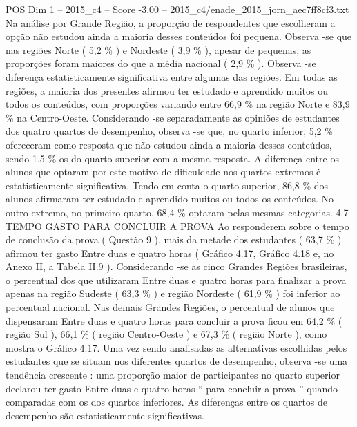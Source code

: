 \begin{textsample}{POS Dim 1 – 2015\_c4 – Score -3.00 – 2015\_c4/enade\_2015\_jorn\_aec7ff8cf3.txt}
Na análise por Grande Região, a proporção de respondentes que escolheram a opção não estudou ainda a maioria desses conteúdos foi pequena.
Observa -se que nas regiões Norte ( 5,2 \% ) e Nordeste ( 3,9 \% ), apesar de pequenas, as proporções foram maiores do que a média nacional ( 2,9 \% ).
Observa -se diferença estatisticamente significativa entre algumas das regiões.
Em todas as regiões, a maioria dos presentes afirmou ter estudado e aprendido muitos ou todos os conteúdos, com proporções variando entre 66,9 \% na região Norte e 83,9 \% na Centro-Oeste.
Considerando -se separadamente as opiniões de estudantes dos quatro quartos de desempenho, observa -se que, no quarto inferior, 5,2 \% ofereceram como resposta que não estudou ainda a maioria desses conteúdos, sendo 1,5 \% os do quarto superior com a mesma resposta.
A diferença entre os alunos que optaram por este motivo de dificuldade nos quartos extremos é estatisticamente significativa.
Tendo em conta o quarto superior, 86,8 \% dos alunos afirmaram ter estudado e aprendido muitos ou todos os conteúdos.
No outro extremo, no primeiro quarto, 68,4 \% optaram pelas mesmas categorias. 4.7 TEMPO GASTO PARA CONCLUIR A PROVA Ao responderem sobre o tempo de conclusão da prova ( Questão 9 ), mais da metade dos estudantes ( 63,7 \% ) afirmou ter gasto Entre duas e quatro horas ( Gráfico 4.17, Gráfico 4.18 e, no Anexo II, a Tabela II.9 ).
Considerando -se as cinco Grandes Regiões brasileiras, o percentual dos que utilizaram Entre duas e quatro horas para finalizar a prova apenas na região Sudeste ( 63,3 \% ) e região Nordeste ( 61,9 \% ) foi inferior ao percentual nacional.
Nas demais Grandes Regiões, o percentual de alunos que dispensaram Entre duas e quatro horas para concluir a prova ficou em 64,2 \% ( região Sul ), 66,1 \% ( região Centro-Oeste ) e 67,3 \% ( região Norte ), como mostra o Gráfico 4.17.
Uma vez sendo analisadas as alternativas escolhidas pelos estudantes que se situam nos diferentes quartos de desempenho, observa -se uma tendência crescente : uma proporção maior de participantes no quarto superior declarou ter gasto Entre duas e quatro horas “ para concluir a prova ” quando comparadas com os dos quartos inferiores.
As diferenças entre os quartos de desempenho são estatisticamente significativas.

\end{textsample}
